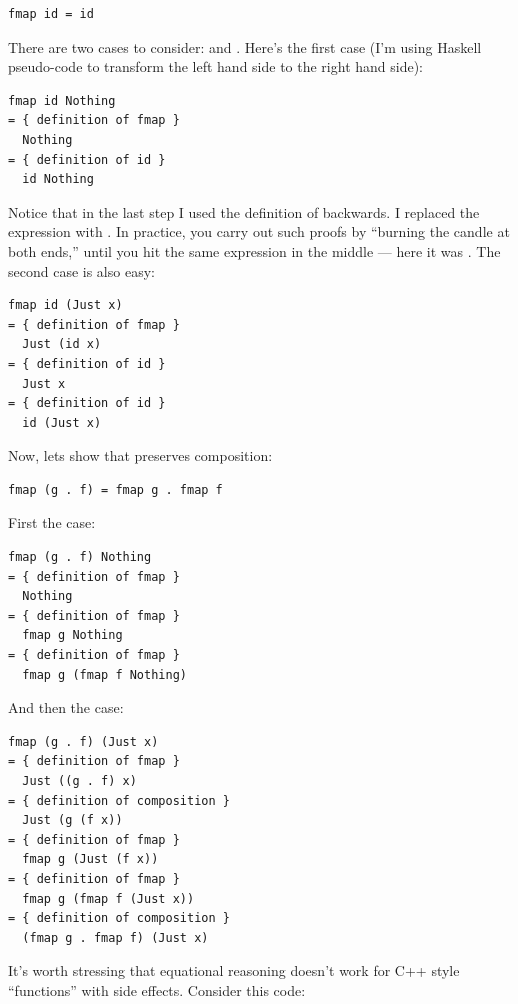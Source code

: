 \begin{Verbatim}[commandchars=\\\{\}]
fmap id = id
\end{Verbatim}
There are two cases to consider:  and .
Here's the first case (I'm using Haskell pseudo-code to transform the
left hand side to the right hand side):

\begin{Verbatim}[commandchars=\\\{\}]
  fmap id Nothing
= { definition of fmap }
  Nothing
= { definition of id } 
  id Nothing
\end{Verbatim}
Notice that in the last step I used the definition of 
backwards. I replaced the expression  with
. In practice, you carry out such proofs by
``burning the candle at both ends,'' until you hit the same expression
in the middle --- here it was . The second case is also
easy:

\begin{Verbatim}[commandchars=\\\{\}]
  fmap id (Just x)
= { definition of fmap }
  Just (id x)
= { definition of id }
  Just x
= { definition of id }
  id (Just x)
\end{Verbatim}
Now, lets show that  preserves composition:

\begin{Verbatim}[commandchars=\\\{\}]
fmap (g . f) = fmap g . fmap f
\end{Verbatim}
First the  case:

\begin{Verbatim}[commandchars=\\\{\}]
  fmap (g . f) Nothing
= { definition of fmap }
  Nothing
= { definition of fmap }
  fmap g Nothing
= { definition of fmap }
  fmap g (fmap f Nothing)
\end{Verbatim}
And then the  case:

\begin{Verbatim}[commandchars=\\\{\}]
  fmap (g . f) (Just x)
= { definition of fmap }
  Just ((g . f) x)
= { definition of composition }
  Just (g (f x))
= { definition of fmap }
  fmap g (Just (f x))
= { definition of fmap }
  fmap g (fmap f (Just x))
= { definition of composition }
  (fmap g . fmap f) (Just x)
\end{Verbatim}
It's worth stressing that equational reasoning doesn't work for C++
style ``functions'' with side effects. Consider this code:

